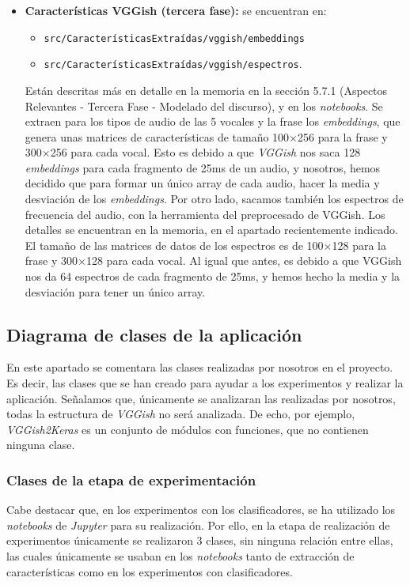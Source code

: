 \begin{itemize}
\item \textbf{Características VGGish (tercera fase):} se encuentran en:
\begin{itemize}
\item \texttt{src/CaracterísticasExtraídas/vggish/embeddings}
\item \texttt{src/CaracterísticasExtraídas/vggish/espectros}.
\end{itemize}  
Están descritas más en detalle en la memoria en la sección 5.7.1 (Aspectos Relevantes - Tercera Fase - Modelado del discurso), y en los \textit{notebooks}. Se extraen para los tipos de audio de las 5 vocales y la frase los \textit{embeddings}, que genera unas matrices de características de tamaño 100$\times$256 para la frase y 300$\times$256 para cada vocal. Esto es debido a que \textit{VGGish} nos saca 128 \textit{embeddings} para cada fragmento de 25ms de un audio, y nosotros, hemos decidido que para formar un único array de cada audio, hacer la media y desviación de los \textit{embeddings}. Por otro lado, sacamos también los espectros de frecuencia del audio, con la herramienta del preprocesado de VGGish. Los detalles se encuentran en la memoria, en el apartado recientemente indicado. El tamaño de las matrices de datos de los espectros es de 100$\times$128 para la frase y 300$\times$128 para cada vocal. Al igual que antes, es debido a que VGGish nos da 64 espectros de cada fragmento de 25ms, y hemos hecho la media y la desviación para tener un único array.
	
\end{itemize} 

\subsection{Diagrama de clases de la aplicación}
En este apartado se comentara las clases realizadas por nosotros en el proyecto. Es decir, las clases que se han creado para ayudar a los experimentos y realizar la aplicación. Señalamos que, únicamente se analizaran las realizadas por nosotros, todas la estructura de \textit{VGGish} no será analizada. De echo, por ejemplo, \textit{VGGish2Keras} es un conjunto de módulos con funciones, que no contienen ninguna clase.

\subsubsection{Clases de la etapa de experimentación}
 Cabe destacar que, en los experimentos con los clasificadores, se ha utilizado los \textit{notebooks} de \textit{Jupyter} para su realización. Por ello, en la etapa de realización de experimentos únicamente se realizaron 3 clases, sin ninguna relación entre ellas, las cuales únicamente se usaban en los \textit{notebooks} tanto de extracción de características como en los experimentos con clasificadores. 

